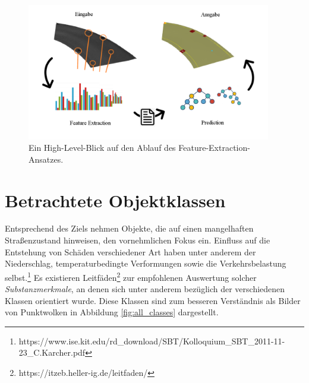 \begin{figure}[!ht]
    \centering
    \includegraphics[width=0.95\textwidth]{graphics/ml_process_adv}
    \caption{Ein High-Level-Blick auf den Ablauf des Feature-Extraction-Ansatzes.}
    \label{fig:ml_process}
\end{figure}

\section{Betrachtete Objektklassen}

Entsprechend des Ziels nehmen Objekte, die auf einen mangelhaften Straßenzustand hinweisen, den vornehmlichen Fokus ein. Einfluss auf die Entstehung von Schäden verschiedener Art haben unter anderem der Niederschlag, temperaturbedingte Verformungen sowie die Verkehrsbelastung selbst.\footnote{https://www.ise.kit.edu/rd\_download/SBT/Kolloquium\_SBT\_2011-11-23\_C.Karcher.pdf} Es existieren Leitfäden\footnote{https://itzeb.heller-ig.de/leitfaden/} zur empfohlenen Auswertung solcher \textit{Substanzmerkmale}, an denen sich unter anderem bezüglich der verschiedenen Klassen orientiert wurde. Diese Klassen sind zum besseren Verständnis als Bilder von Punktwolken in Abbildung \ref{fig:all_classes} dargestellt.


